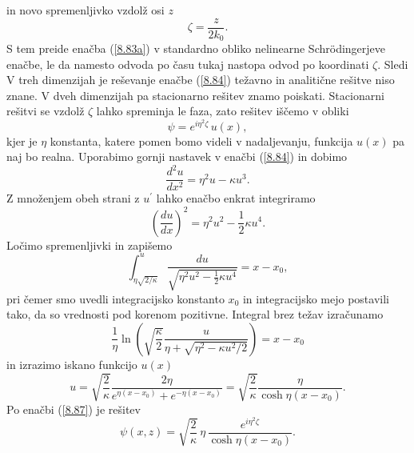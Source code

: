  in novo spremenljivko vzdolž osi $z$
\begin{equation}
\zeta=\frac{z}{2k_{0}}.
\end{equation}
 S tem preide enačba (\ref{8.83a}) v standardno obliko nelinearne Schr\"odingerjeve
enačbe, le da namesto odvoda po času tukaj nastopa odvod po koordinati $\zeta$. Sledi
V treh dimenzijah je reševanje enačbe (\ref{8.84}) težavno in analitične
rešitve niso znane. V dveh dimenzijah pa stacionarno rešitev znamo
poiskati. Stacionarni rešitvi se vzdolž $\zeta$ lahko spreminja le faza, zato
rešitev iščemo v obliki 
\begin{equation}
\psi=e^{i\eta^{2}\zeta}\, u(x),
\label{8.87}
\end{equation}
 kjer je $\eta$ konstanta, katere pomen bomo videli v nadaljevanju, 
 funkcija $u(x)$ pa naj bo realna. 
Uporabimo gornji nastavek v enačbi (\ref{8.84}) in dobimo
\begin{equation}
\frac{d^{2}u}{dx^{2}}=\eta^{2}u-\kappa u^{3}.
\end{equation}
 Z množenjem obeh strani z $u^{\prime}$ lahko enačbo enkrat integriramo
\begin{equation}
\left(\frac{du}{dx}\right)^{2}=\eta^{2}u^{2}-\frac{1}{2}\kappa u^{4}.
\end{equation}
Ločimo spremenljivki in zapišemo 
\begin{equation}
\int_{\eta\sqrt{2/\kappa}}^{u}\frac{du}{\sqrt{\eta^{2}u^2-\frac{1}{2}\kappa u^{4}}}=x-x_{0},
\label{8.85}
\end{equation}
pri čemer smo uvedli integracijsko konstanto $x_{0}$ in integracijsko mejo postavili 
tako, da so vrednosti pod korenom pozitivne.
Integral brez težav izračunamo
\begin{equation}
\frac{1}{\eta}\ln\left(\sqrt{\frac{\kappa}{2}}\frac{u}{\eta+
\sqrt{\eta^{2}-\kappa u^{2}/2}}\right)=x-x_{0}
\end{equation}
in izrazimo iskano funkcijo $u(x)$
\begin{equation}
u=\sqrt{\frac{2}{\kappa}}\frac{2 \eta }{e^{\eta(x-x_{0})}+e^{-\eta(x-x_{0})}}=
\sqrt{\frac{2}{\kappa}}\frac{\eta}{\cosh\eta(x-x_{0})}.
\label{8.86}
\end{equation}
Po enačbi (\ref{8.87}) je rešitev
\begin{equation}
\psi(x,z)=\sqrt{\frac{2}{\kappa}}\,\eta\,\frac{e^{i\eta^{2}\zeta}}{\cosh\eta(x-x_{0})}.
\label{8.88}
\end{equation}
